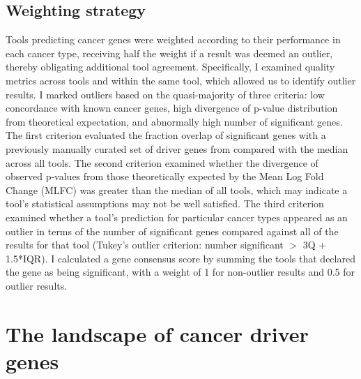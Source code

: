 \subsection{Weighting strategy}
\label{sec:weighting}
Tools predicting cancer genes were weighted according to their performance in each cancer type, receiving half the weight if a result was deemed an outlier, thereby obligating additional tool agreement. Specifically, I examined quality metrics across tools and within the same tool, which allowed us to identify outlier results. I marked outliers based on the quasi-majority of three criteria: low concordance with known cancer genes, high divergence of p-value distribution from theoretical expectation, and abnormally high number of significant genes. The first criterion evaluated the fraction overlap of significant genes with a previously manually curated set of driver genes from \cite{RN25} compared with the median across all tools. The second criterion examined whether the divergence of observed p-values from those theoretically expected by the Mean Log Fold Change (MLFC) \cite{RN70} was greater than the median of all tools, which may indicate a tool's statistical assumptions may not be well satisfied. The third criterion examined whether a tool's prediction for particular cancer types appeared as an outlier in terms of the number of significant genes compared against all of the results for that tool (Tukey's outlier criterion: number significant $>$ 3Q + 1.5*IQR). I calculated a gene consensus score by summing the tools that declared the gene as being significant, with a weight of 1 for non-outlier results and 0.5 for outlier results.

\section{The landscape of cancer driver genes}



